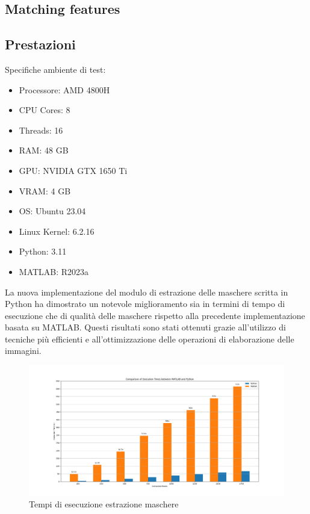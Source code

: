 \documentclass[a4paper,12pt]{report}
\begin{document}
    \subsection{Matching features}
    \newpage

    \subsection{Prestazioni}
    Specifiche ambiente di test:

    \begin{itemize}
      \item Processore: AMD 4800H
      \item CPU Cores: 8
      \item Threads: 16
      \item RAM: 48 GB
      \item GPU: NVIDIA GTX 1650 Ti
      \item VRAM: 4 GB
      \item OS: Ubuntu 23.04
      \item Linux Kernel: 6.2.16
      \item Python: 3.11
      \item MATLAB: R2023a
    \end{itemize}

    La nuova implementazione del modulo di estrazione delle maschere scritta in Python ha dimostrato un notevole miglioramento sia in termini di tempo di esecuzione che di qualità delle maschere rispetto alla precedente implementazione basata su MATLAB. Questi risultati sono stati ottenuti grazie all'utilizzo di tecniche più efficienti e all'ottimizzazione delle operazioni di elaborazione delle immagini.

    \begin{figure}[H]
      \centering
      \includegraphics[width=\textwidth]{assets/images/results/result_execution_time.png}   
      \caption{Tempi di esecuzione estrazione maschere}
    \end{figure}
    
\end{document}
